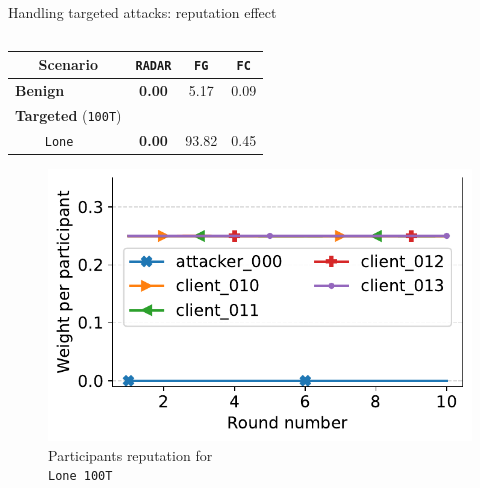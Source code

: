 \begin{frame}{Handling targeted attacks: reputation effect}
\begin{columns}
\begin{column}{.6\textwidth}
  \begin{minipage}[t][0.35\textheight]{\textwidth}
                \centering
                \begin{table}
                    \centering
                    \footnotesize
                    \setlength\tabcolsep{1ex}
                        \begin{tabularx}{.7\textwidth}{lX|ccc}
                            \toprule %
                            \multicolumn{2}{c|}{{\textbf{Scenario}}}
                            & \multicolumn{1}{c}{\texttt{RADAR}} & \multicolumn{1}{c}{\texttt{FG}} & \multicolumn{1}{c|}{\texttt{FC}} \\
                            \midrule %
                            \multicolumn{2}{l|}{\textbf{Benign}}& \textbf{0.00} & 5.17 &  0.09  \\
                            \multicolumn{2}{l|}{\textbf{Targeted} (\texttt{100T})}  & & & \\    
                            & \texttt{Lone} &\textbf{0.00} & 93.82 &  0.45 \\
                        \end{tabularx}
                \end{table}
        \end{minipage}
    \begin{minipage}[t][0.65\textheight]{\textwidth}
        \begin{figure}
            \captionsetup{justification=centering}
                \includegraphics[width=0.65\linewidth]{./figures/eval/reput/lone_loud_expanded.pdf}
                \caption{Participants reputation for\\
                \texttt{Lone 100T}}
      \end{figure}
    \end{minipage}  
  
    \end{column}
  \end{columns}
\end{frame}



